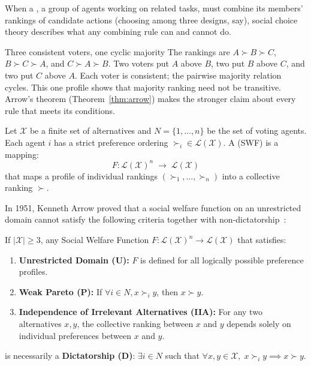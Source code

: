 When a , a group of agents working on related tasks, must combine its members' rankings of candidate actions (choosing among three designs, say), social choice theory describes what any combining rule can and cannot do.

\begin{pdexample}{Three consistent voters, one cyclic majority}
The rankings are $A\succ B\succ C$, $B\succ C\succ A$, and $C\succ A\succ B$.
Two voters put $A$ above $B$, two put $B$ above $C$, and two put $C$ above $A$.
Each voter is consistent; the pairwise majority relation cycles. This one
profile shows that majority ranking need not be transitive. Arrow's theorem
(Theorem~\ref{thm:arrow}) makes the stronger claim about every rule that meets
its conditions.
\end{pdexample}

Let $\mathcal X$ be a finite set of alternatives and $N = \{1, \dots, n\}$ be the set of voting agents. Each agent $i$ has a strict preference ordering $\succ_i \in \mathcal{L}(\mathcal X)$. A  (SWF) is a mapping:
\begin{equation}
F: \mathcal{L}(\mathcal X)^n \;\to\; \mathcal{L}(\mathcal X)
\end{equation}
that maps a profile of individual rankings $(\succ_1, \dots, \succ_n)$ into a collective ranking $\succ$.

In 1951, Kenneth Arrow proved that a social welfare function on an unrestricted domain cannot satisfy the following criteria together with non-dictatorship~:

\begin{theorem}\label{thm:arrow}
If $|\mathcal X| \ge 3$, any Social Welfare Function $F: \mathcal{L}(\mathcal X)^n \to \mathcal{L}(\mathcal X)$ that satisfies:
\begin{enumerate}[leftmargin=1.5em,itemsep=1.5pt]
  \item \textbf{Unrestricted Domain (U):} $F$ is defined for all logically possible preference profiles.
  \item \textbf{Weak Pareto (P):} If $\forall i \in N, x \succ_i y$, then $x \succ y$.
  \item \textbf{Independence of Irrelevant Alternatives (IIA):} For any two alternatives $x, y$, the collective ranking between $x$ and $y$ depends solely on individual preferences between $x$ and $y$.
\end{enumerate}
is necessarily a \textbf{Dictatorship (D)}: $\exists i \in N$ such that $\forall x, y \in \mathcal X, \; x \succ_i y \implies x \succ y$.
\end{theorem}


